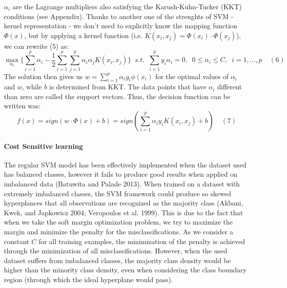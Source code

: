 \documentclass[12pt,]{article}
\let\oldparagraph\paragraph
\renewcommand{\paragraph}[1]{\oldparagraph{#1}\mbox{}}
\begin{document}
\(\alpha_i\) are the Lagrange multipliers also satisfying the
Karush-Kuhn-Tucker (KKT) conditions (see Appendix). Thanks to another
one of the strenghts of SVM - kernel representation - we don't need to
explicitly know the mapping function \(\Phi(x)\), but by applying a
kernel function (i.e. \(K(x_i,x_j) = \Phi(x_i)\cdot \Phi(x_j)\)), we can
rewrite (5) as:
\[\max_{\alpha_i} \{ \sum_{i=1}^{p}{\alpha_i} - \frac{1}{2} \sum_{i=1}^{p}\sum_{j=1}^{p}{\alpha_i\alpha_jK(x_i,x_j)} \} \;\; s.t. \;\; \sum_{i=1}^{p}{y_i\alpha_i}=0, \;\; 0 \leq\alpha_i\leq C, \;\; i=1,...,p\;\;\;\;(6)\]
The solution then gives us \(w = \sum_{i=1}^{p}{\alpha_iy_i}\phi(x_i)\)
for the optimal values of \(\alpha_i\) and \(w\), while \(b\) is
determined from KKT. The data points that have \(\alpha_i\) different
than zero are called the support vectors. Thus, the decision function
can be written was:
\[f(x) = sign(w \cdot \Phi(x) + b) = sign(\sum_{i=1}^{p}{\alpha_iy_i}K(x_i,x_j) + b)\;\;\;\;(7) \]

\hypertarget{cost-sensitive-learning}{%
\paragraph{Cost Sensitive learning}\label{cost-sensitive-learning}}

The regular SVM model has been effectively implemented when the dataset
used has balanced classes, however it fails to produce good results when
applied on imbalanced data (Batuwita and Palade 2013). When trained on a
dataset with extremely imbalanced classes, the SVM framework could
produce so skewed hyperplances that all observations are recognized as
the majority class (Akbani, Kwek, and Japkowicz 2004; Veropoulos et al.
1999). This is due to the fact that when we take the soft margin
optimization problem, we try to maximize the margin and minimize the
penalty for the misclassifications. As we consider a constant \(C\) for
all training examples, the minimization of the penalty is achieved
through the minimization of all misclassifications. However, when the
used dataset suffers from imbalanced classes, the majority class density
would be higher than the minority class density, even when considering
the class boundary region (through which the ideal hyperplane would
pass).
\end{document}
